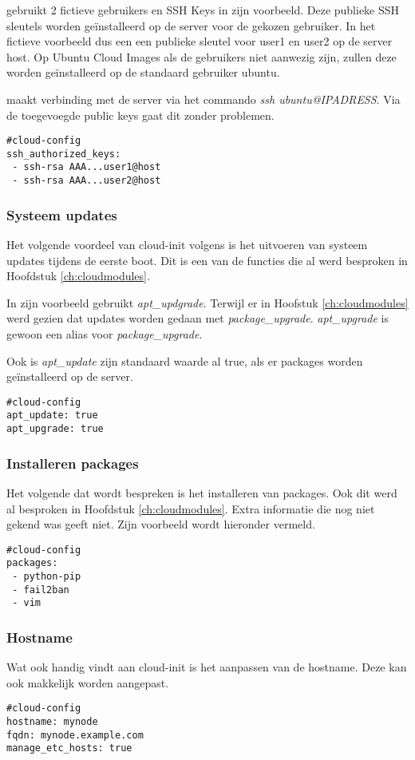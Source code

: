 \autocite{viktorpet} gebruikt 2 fictieve gebruikers en SSH Keys in zijn voorbeeld. Deze publieke SSH sleutels worden geïnstalleerd op de server voor de gekozen gebruiker. In het fictieve voorbeeld dus een een publieke sleutel voor user1 en user2 op de server host. Op Ubuntu Cloud Images als de gebruikers niet aanwezig zijn, zullen deze worden geïnstalleerd op de standaard gebruiker ubuntu. 

\autocite{viktorpet} maakt verbinding met de server via het commando \textit{ssh ubuntu@IPADRESS}. Via de toegevoegde public keys gaat dit zonder problemen.
\begin{lstlisting}
#cloud-config
ssh_authorized_keys:
 - ssh-rsa AAA...user1@host
 - ssh-rsa AAA...user2@host
\end{lstlisting} 

\newpage
\subsubsection{Systeem updates}
Het volgende voordeel van cloud-init volgens \autocite{viktorpet} is het uitvoeren van systeem updates tijdens de eerste boot. Dit is een van de functies die al werd besproken in Hoofdstuk \ref*{ch:cloudmodules}.

In zijn voorbeeld gebruikt \autocite{viktorpet} \textit{apt\_updgrade}. Terwijl er in Hoofstuk \ref*{ch:cloudmodules} werd gezien dat updates worden gedaan met \textit{package\_upgrade}. \textit{apt\_upgrade} is gewoon een alias voor \textit{package\_upgrade}.

Ook is \textit{apt\_update} zijn standaard waarde al true, als er packages worden geïnstalleerd op de server. 
\begin{lstlisting}
#cloud-config
apt_update: true
apt_upgrade: true
\end{lstlisting} 

\subsubsection{Installeren packages}
Het volgende dat wordt bespreken is het installeren van packages. Ook dit werd al besproken in Hoofdstuk \ref*{ch:cloudmodules}. Extra informatie die nog niet gekend was geeft \autocite{viktorpet} niet. Zijn voorbeeld wordt hieronder vermeld.
\begin{lstlisting}
#cloud-config
packages:
 - python-pip
 - fail2ban
 - vim
\end{lstlisting} 

\subsubsection{Hostname}
Wat \autocite{viktorpet} ook handig vindt aan cloud-init is het aanpassen van de hostname. Deze kan ook makkelijk worden aangepast.
\begin{lstlisting}
#cloud-config
hostname: mynode
fqdn: mynode.example.com
manage_etc_hosts: true
\end{lstlisting} 

